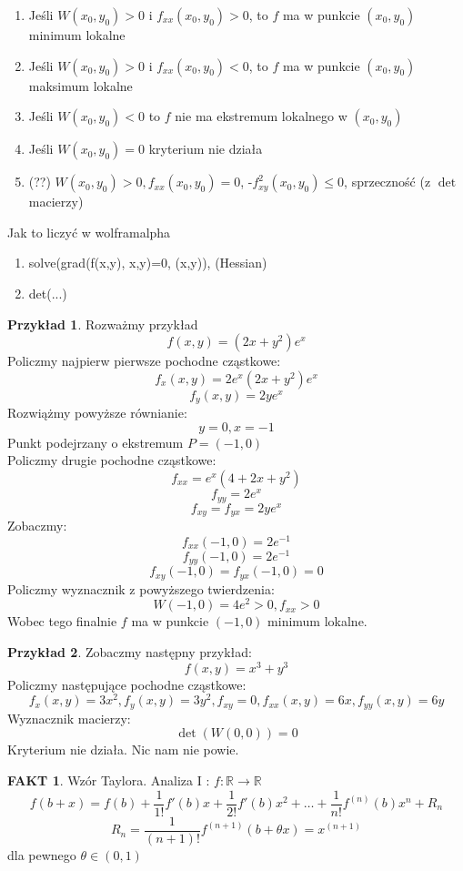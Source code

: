 \documentclass{article}
\theoremstyle{definition}
\theoremstyle{definition}
\theoremstyle{definition}
\newtheorem{pk}{Przykład}[subsection]
\theoremstyle{definition}
\theoremstyle{definition}
\theoremstyle{definition}
\theoremstyle{definition}
\newtheorem*{fakt}{FAKT}
\begin{document}
\begin{enumerate}
    \item Jeśli $W(x_0, y_0) > 0$ i $f_{xx} (x_0,y_0) > 0$, to $f$ ma w punkcie $(x_0,y_0)$ minimum lokalne
    \item Jeśli $W(x_0, y_0) > 0$ i $f_{xx} (x_0,y_0) < 0$, to $f$ ma w punkcie $(x_0,y_0)$ maksimum lokalne
    \item Jeśli $W(x_0, y_0) < 0$ to $f$ nie ma ekstremum lokalnego w $(x_0,y_0)$
    \item Jeśli $W(x_0, y_0) = 0$ kryterium nie działa
    \item (??) $W(x_0, y_0) > 0, f_{xx} (x_0, y_0) = 0$, -$f_{xy}^2 (x_0,y_0) \leq 0$, sprzeczność (z $\det$ macierzy)
\end{enumerate}
Jak to liczyć w wolframalpha

\begin{enumerate}
    \item solve(grad(f(x,y), {x,y})=0, (x,y)), (Hessian)
    \item det(...)
\end{enumerate}

\begin{pk}
    Rozważmy przykład \\
    \[ f(x,y) = (2x+y^2)e^x \]
    Policzmy najpierw pierwsze pochodne cząstkowe:
    \[ f_x(x,y) = 2e^x (2x+y^2)e^x\]
    \[ f_y(x,y) = 2y e^x\]
    Rozwiążmy powyższe równianie:
    \[ y = 0, x = -1\]
    Punkt podejrzany o ekstremum $P=(-1,0)$\\
    Policzmy drugie pochodne cząstkowe:
    \[ f_{xx} = e^x (4 + 2x + y^2) \]
    \[ f_{yy} = 2 e^x\]
    \[ f_{xy} = f_{yx} = 2y e^x\]
    Zobaczmy:
    \[ f_{xx} (-1,0) = 2e^{-1}\]
    \[ f_{yy} (-1,0) = 2e^{-1}\]
    \[ f_{xy} (-1,0) = f_{yx} (-1,0) = 0 \]
    Policzmy wyznacznik z powyższego twierdzenia:
    \[ W(-1, 0) = 4e^2 > 0, f_{xx} > 0 \]
    Wobec tego finalnie $f$ ma w punkcie $(-1,0)$ minimum lokalne.
\end{pk}

\begin{pk}
    Zobaczmy następny przykład:
    \[ f(x,y) = x^3 + y^3\]
    Policzmy następujące pochodne cząstkowe:
    \[ f_x(x,y)=3x^2, f_y(x,y)=3y^2, f_{xy}=0, f_{xx}(x,y) = 6x ,f_{yy}(x,y) = 6y\]
    Wyznacznik macierzy:
    \[ \det(W(0,0)) = 0\]
    Kryterium nie działa. Nic nam nie powie.
\end{pk}

\begin{fakt}
Wzór Taylora. Analiza I : $f:\mathbb{R} \rightarrow \mathbb{R}$
\[f(b+x) = f(b) + \frac{1}{1!} f'(b)x + \frac{1}{2!} f'(b) x^2 + \dots + \frac{1}{n!} f^{(n)}(b) x^n + R_n\]
\[R_n = \frac{1}{(n+1)!} f^{(n+1)} (b+\theta x) = x^{(n+1)} \]
dla pewnego $\theta\in(0,1)$\\
\end{fakt}
\end{document}
